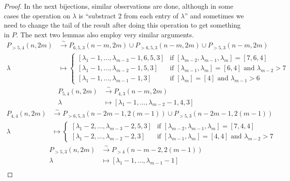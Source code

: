 \documentclass[12pt, a4paper]{article}
\begin{document}
\begin{proof}
  In the next bijections, similar observations are done, although in some cases the operation on $\lambda$ is ``substract 2 from each entry of $\lambda$'' and sometimes we need to change the tail of the result after doing this operation to get something in $P$.
  The next two lemmas also employ very similar arguments.
  \begin{align*}
    P_{>5, 4}(n, 2m) &\xrightarrow{\sim} P_{6, 5, 3}(n - m, 2m) \cup P_{>6, 5, 3}(n - m, 2m) \cup P_{>5, 3}(n - m, 2m) \\
    \lambda &\mapsto
              \begin{cases}
                [\lambda_1 - 1, \dots, \lambda_{m - 3} - 1, 6, 5, 3] &\text{if }[\lambda_{m - 2}, \lambda_{m - 1}, \lambda_m] = [7, 6, 4] \\
                [\lambda_1 - 1, \dots, \lambda_{m - 2} - 1, 5, 3] &\text{if }[\lambda_{m - 1}, \lambda_m] = [6, 4]\text{ and }\lambda_{m - 2} >7 \\
                [\lambda_1 - 1, \dots, \lambda_{m - 1} - 1, 3] &\text{if }[\lambda_m] = [4]\text{ and }\lambda_{m - 1} > 6
              \end{cases}
  \end{align*}
  \begin{align*}
    P_{5, 4}(n, 2m) &\xrightarrow{\sim} P_{4, 3}(n - m, 2m) \\
    \lambda &\mapsto [\lambda_1 - 1, \dots, \lambda_{m - 2} - 1, 4, 3]
  \end{align*}
  \begin{align*}
    P_{4, 4}(n, 2m) &\xrightarrow{\sim} P_{>6, 5, 3}(n - 2m - 1, 2(m - 1)) \cup P_{>5, 3}(n - 2m - 1, 2(m - 1)) \\
    \lambda &\mapsto
              \begin{cases}
                [\lambda_1 - 2, \dots, \lambda_{m - 3} - 2, 5, 3] &\text{if }[\lambda_{m - 2}, \lambda_{m - 1}, \lambda_m] = [7, 4, 4] \\
                [\lambda_1 - 2, \dots, \lambda_{m - 2} - 2, 3] &\text{if }[\lambda_{m - 1}, \lambda_m] = [4, 4]\text{ and }\lambda_{m - 2} > 7
              \end{cases}
  \end{align*}
  \begin{align*}
    P_{>5, 3}(n, 2m) &\xrightarrow{\sim} P_{>4}(n - m - 2, 2(m - 1)) \\
    \lambda &\mapsto [\lambda_1 - 1, \dots, \lambda_{m - 1} - 1]
  \end{align*}
  \begin{align*}

\end{align*}
\end{proof}
\end{document}
